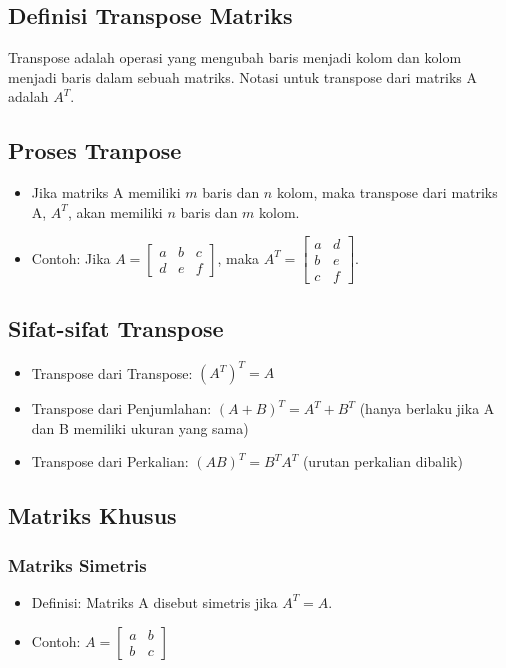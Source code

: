 \documentclass{article}
\begin{document}
\subsection{Definisi Transpose Matriks}
Transpose adalah operasi yang mengubah baris menjadi kolom dan kolom menjadi baris dalam sebuah matriks. Notasi untuk transpose dari matriks A adalah \( A^T \).

\subsection{Proses Tranpose}
\begin{itemize}
    \item Jika matriks A memiliki \( m \) baris dan \( n \) kolom, maka transpose dari matriks A, \( A^T \), akan memiliki \( n \) baris dan \( m \) kolom.
    \item Contoh: Jika \( A = \begin{bmatrix} a & b & c \\ d & e & f \end{bmatrix} \), maka \( A^T = \begin{bmatrix} a & d \\ b & e \\ c & f \end{bmatrix} \).
\end{itemize}

\subsection{Sifat-sifat Transpose}
\begin{itemize}
    \item Transpose dari Transpose: \( (A^T)^T = A \)
    \item Transpose dari Penjumlahan: \( (A + B)^T = A^T + B^T \) (hanya berlaku jika A dan B memiliki ukuran yang sama)
    \item Transpose dari Perkalian: \( (AB)^T = B^T A^T \) (urutan perkalian dibalik)
\end{itemize}

\subsection{Matriks Khusus}
\subsubsection{Matriks Simetris}
\begin{itemize}
    \item Definisi: Matriks A disebut simetris jika \( A^T = A \).
    \item Contoh: \( A = \begin{bmatrix} a & b \\ b & c \end{bmatrix} \)
\end{itemize}
\end{document}
